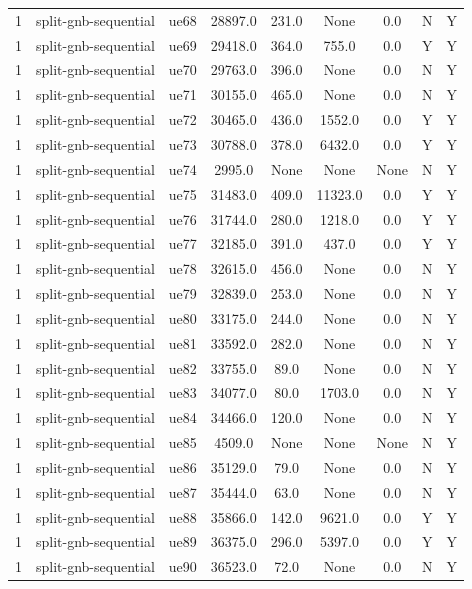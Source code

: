 \begin{table}[ht]
\begin{tabular}{|c|c|c|c|c|c|c|c|c|}
1 & split-gnb-sequential & ue68 & 28897.0 & 231.0 & None & 0.0 & N & Y \\
1 & split-gnb-sequential & ue69 & 29418.0 & 364.0 & 755.0 & 0.0 & Y & Y \\
1 & split-gnb-sequential & ue70 & 29763.0 & 396.0 & None & 0.0 & N & Y \\
1 & split-gnb-sequential & ue71 & 30155.0 & 465.0 & None & 0.0 & N & Y \\
1 & split-gnb-sequential & ue72 & 30465.0 & 436.0 & 1552.0 & 0.0 & Y & Y \\
1 & split-gnb-sequential & ue73 & 30788.0 & 378.0 & 6432.0 & 0.0 & Y & Y \\
1 & split-gnb-sequential & ue74 & 2995.0 & None & None & None & N & Y \\
1 & split-gnb-sequential & ue75 & 31483.0 & 409.0 & 11323.0 & 0.0 & Y & Y \\
1 & split-gnb-sequential & ue76 & 31744.0 & 280.0 & 1218.0 & 0.0 & Y & Y \\
1 & split-gnb-sequential & ue77 & 32185.0 & 391.0 & 437.0 & 0.0 & Y & Y \\
1 & split-gnb-sequential & ue78 & 32615.0 & 456.0 & None & 0.0 & N & Y \\
1 & split-gnb-sequential & ue79 & 32839.0 & 253.0 & None & 0.0 & N & Y \\
1 & split-gnb-sequential & ue80 & 33175.0 & 244.0 & None & 0.0 & N & Y \\
1 & split-gnb-sequential & ue81 & 33592.0 & 282.0 & None & 0.0 & N & Y \\
1 & split-gnb-sequential & ue82 & 33755.0 & 89.0 & None & 0.0 & N & Y \\
1 & split-gnb-sequential & ue83 & 34077.0 & 80.0 & 1703.0 & 0.0 & N & Y \\
1 & split-gnb-sequential & ue84 & 34466.0 & 120.0 & None & 0.0 & N & Y \\
1 & split-gnb-sequential & ue85 & 4509.0 & None & None & None & N & Y \\
1 & split-gnb-sequential & ue86 & 35129.0 & 79.0 & None & 0.0 & N & Y \\
1 & split-gnb-sequential & ue87 & 35444.0 & 63.0 & None & 0.0 & N & Y \\
1 & split-gnb-sequential & ue88 & 35866.0 & 142.0 & 9621.0 & 0.0 & Y & Y \\
1 & split-gnb-sequential & ue89 & 36375.0 & 296.0 & 5397.0 & 0.0 & Y & Y \\
1 & split-gnb-sequential & ue90 & 36523.0 & 72.0 & None & 0.0 & N & Y \\

\end{tabular}
\end{table}

